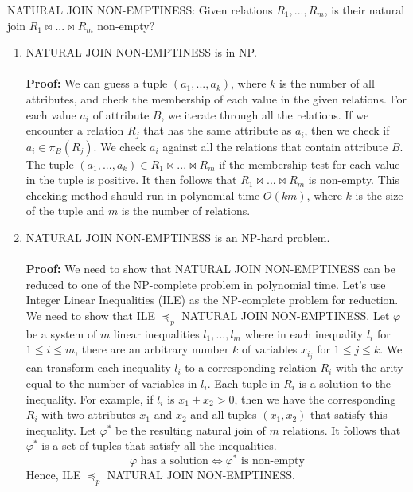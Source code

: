 NATURAL JOIN NON-EMPTINESS: Given relations $R_1,...,R_m$, is their natural join 
$R_1 \bowtie ... \bowtie R_m$ non-empty?
\begin{enumerate} 
  \item NATURAL JOIN NON-EMPTINESS is in NP. \\ \\
  \textbf{Proof:} We can guess a tuple $(a_1,...,a_k)$, where $k$ is the number of 
  all attributes, and check the membership of 
  each value in the given relations. For each value $a_i$ of attribute $B$, we iterate through 
  all the relations. If we encounter a relation $R_j$ that has the same attribute as $a_i$, 
  then we check if $a_i \in \pi _B(R_j)$. We check $a_i$ against all the relations 
  that contain attribute $B$. The tuple $(a_1,...,a_k) \in R_1 \bowtie ... \bowtie 
  R_m$ if the membership test for each value in the tuple is positive. It then follows that 
  $R_1 \bowtie ... \bowtie R_m$ is non-empty. This checking method should run in polynomial 
  time $O(km)$, where $k$ is the size of the tuple and $m$ is the number of relations. 
  
  \item NATURAL JOIN NON-EMPTINESS is an NP-hard problem. \\ \\
  \textbf{Proof:} We need to show that NATURAL JOIN NON-EMPTINESS can be reduced to 
  one of the NP-complete problem in polynomial time. Let's use Integer Linear 
  Inequalities (ILE) as the NP-complete problem for reduction. We need to show that 
  ILE $\preceq _{p}$ NATURAL JOIN NON-EMPTINESS. Let $\varphi$ be a system of $m$ linear 
  inequalities $l_1,...,l_m$ where in each inequality $l_i$ for $1 \leq i \leq m$, there 
  are an arbitrary number $k$ of variables $x_{i_j}$ for $1 \leq j \leq k$. We can transform 
  each inequality $l_i$ to a corresponding relation $R_i$ with the arity equal to 
  the number of variables in $l_i$. Each tuple in $R_i$ is a solution to the inequality. 
  For example, if $l_i$ is $x_1 + x_2 > 0$, then we have the corresponding $R_i$ with two attributes 
  $x_1$ and $x_2$ and all tuples $(x_1,x_2)$ that satisfy this inequality. Let $\varphi ^*$ be 
  the resulting natural join of $m$ relations. It follows that $\varphi ^*$ is 
  a set of tuples that satisfy all the inequalities.
  \begin{equation*}
    \varphi \text{ has a solution} \Longleftrightarrow \varphi ^* \text{ is non-empty}
  \end{equation*}
  Hence, ILE $\preceq _{p}$ NATURAL JOIN NON-EMPTINESS.


\end{enumerate}
